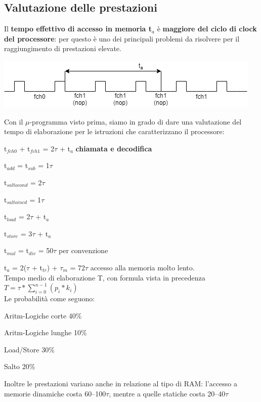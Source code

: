\documentclass[10pt]{report}
\begin{document}
\subsection{Valutazione delle prestazioni}
Il \textbf{tempo effettivo di accesso in memoria t$_a$} è \textbf{maggiore del ciclo di clock del processore}: per questo è uno dei principali problemi da risolvere per il raggiungimento di prestazioni elevate.
\begin{center}
\includegraphics[scale=1]{valprest.png}
\end{center}
\begin{multicols}{2}
Con il $\mu$-programma visto prima, siamo in grado di dare una valutazione del tempo di elaborazione per le istruzioni che caratterizzano il processore:
\begin{list}{}{}
	\item t$_{fch0}$ + t$_{fch1}$ = 2$\tau$ + t$_a$ \textbf{chiamata e decodifica}
	\item t$_{add}$ = t$_{sub}$ = 1$\tau$
	\item t$_{saltocond}$ = 2$\tau$
	\item t$_{saltoincd}$ = 1$\tau$
	\item t$_{load}$ = 2$\tau$ + t$_a$
	\item t$_{store}$ = 3$\tau$ + t$_a$
	\item t$_{mul}$ = t$_{div}$ = 50$\tau$ per convenzione
\end{list}
t$_a$ = 2($\tau$ + t$_{tr}$) + $\tau_m$ = 72$\tau$ accesso alla memoria molto lento.\\

\columnbreak
Tempo medio di elaborazione T, con formula vista in precedenza \texttt{$T = \tau * \sum_{i = 0}^{n - 1}(p_i * k_i) $}\\
Le probabilità come seguono:
\begin{list}{}{}
	\item Aritm-Logiche corte 40\%
	\item Aritm-Logiche lunghe 10\%
	\item Load/Store 30\%
	\item Salto 20\%
\end{list}
Inoltre le prestazioni variano anche in relazione al tipo di RAM: l'accesso a memorie dinamiche costa 60--100$\tau$, mentre a quelle statiche costa 20--40$\tau$
\end{multicols}
\pagebreak
\end{document}
